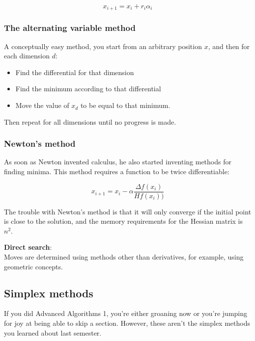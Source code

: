 \begin{description}
    \[
      x_{i+1} = x_i + r_i\alpha_i
    \]

    \subsubsection{The alternating variable method}

    A conceptually easy method, you start from an arbitrary position $x$, and
    then for each dimension $d$:

    \begin{itemize}
      \item Find the differential for that dimension
      \item Find the minimum according to that differential
      \item Move the value of $x_d$ to be equal to that minimum.
    \end{itemize}

    Then repeat for all dimensions until no progress is made.


    \subsubsection{Newton's method}

    As soon as Newton invented calculus, he also started inventing methods for
    finding minima. This method requires a function to be twice differentiable:

    \[
      x_{i+1} = x_i - \alpha\frac{\Delta f(x_i)}{Hf(x_i))}
    \]


    The trouble with Newton's method is that it will only converge if the
    initial point is close to the solution, and the memory requirements for the
    Hessian matrix is $n^2$.

  \item \textbf{Direct search}:\\
    Moves are determined using methods other than derivatives, for example,
    using geometric concepts.

    \subsection{Simplex methods}

    If you did Advanced Algorithms 1, you're either groaning now or you're
    jumping for joy at being able to skip a section. However, these aren't the
    simplex methods you learned about last semester.


\end{description}
